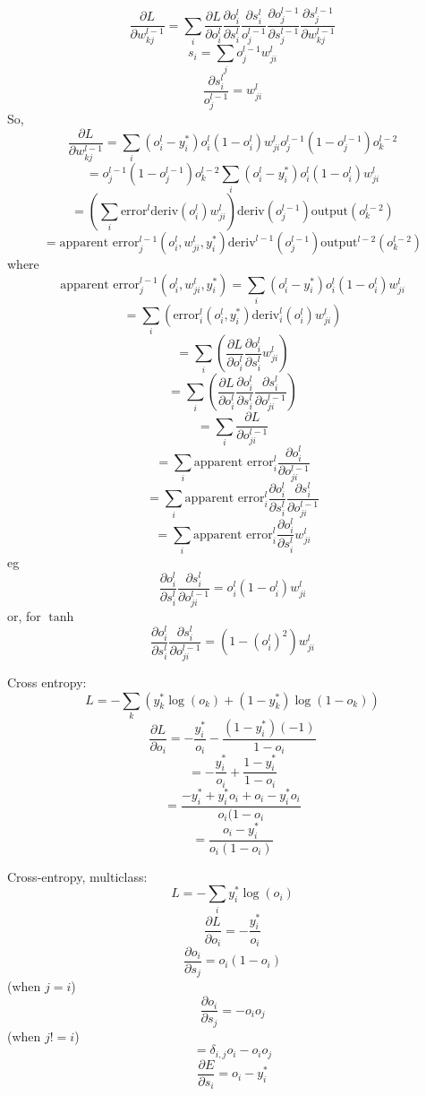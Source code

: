\documentclass[a4paper,12pt,fleqn]{article}
\newcommand{\ult}{\vspace{12px}\noindent}
\begin{document}
\[ \frac{\partial L}{\partial w^{l-1}_{kj}} = \sum_i \frac{\partial L}{\partial o^l_i}
\frac{\partial o^l_i}{\partial s^l_i} \frac{\partial s^l_i}{o^{l-1}_j}\frac{\partial o^{l-1}_j}{\partial s^{l-1}_j}
\frac{\partial s^{l-1}_j}{\partial w^{l-1}_{kj}} \]
\[ s_i =  \sum_j o^{l-1}_j w^l_{ji} \]
\[ \frac{\partial s^l_i}{o^{l-1}_j} = w^l_{ji} \]
So, \[ \frac{\partial L}{\partial w^{l-1}_{kj}} =\sum_i (o^l_i - y^*_i)o^l_i(1-o^l_i)w^l_{ji}o^{l-1}_{j}(1 - o^{l-1}_{j})o^{l-2}_k \]
\[ = o^{l-1}_{j}(1 - o^{l-1}_{j})o^{l-2}_k \sum_i (o^l_i - y^*_i)o^l_i(1-o^l_i)w^l_{ji} \]
\[ = (\sum_i \text{error}^l \text{deriv}(o^l_i) w^l_{ji}) \text{deriv}(o^{l-1}_j) \text{output}(o^{l-2}_k)   \]
\[ = \text{apparent error}^{l-1}_j(o^l_i, w^l_{ji}, y^*_i) \text{deriv}^{l-1}(o^{l-1}_j) \text{output}^{l-2}(o^{l-2}_k) \]
where \[ \text{apparent error}^{l-1}_j(o^l_i, w^l_{ji}, y^*_i) = \sum_i (o^l_i - y^*_i)o^l_i(1-o^l_i)w^l_{ji} \]
\[ = \sum_i (\text{error}^l_i(o^l_i, y^*_i)\text{deriv}^l_i(o^l_i)w^l_{ji}) \]
\[ = \sum_i ( \frac{\partial L}{\partial o^l_i} \frac{\partial o^l_i}{\partial s^l_i} w^l_{ji} ) \]
\[ = \sum_i ( \frac{\partial L}{\partial o^l_i} \frac{\partial o^l_i}{\partial s^l_i} \frac{\partial s^l_i}{\partial o^{l-1}_{ji}} ) \]
\[ =\sum_i \frac{\partial L}{\partial o^{l-1}_{ji}} \]
\[ =\sum_i \text{apparent error}^l_i \frac{\partial o^l_i}{\partial o^{l-1}_{ji}} \]
\[ =\sum_i \text{apparent error}^l_i \frac{\partial o^l_i}{\partial s^l_i} \frac{\partial s^l_i}{\partial o^{l-1}_{ji}} \]
\[ =\sum_i \text{apparent error}^l_i \frac{\partial o^l_i}{\partial s^l_i} w^l_{ji} \]
eg \[ \frac{\partial o^l_i}{\partial s^l_i} \frac{\partial s^l_i}{\partial o^{l-1}_{ji}} 
= o^l_i(1-o^l_i) w^l_{ji} \]
or, for $\tanh$ \[ \frac{\partial o^l_i}{\partial s^l_i} \frac{\partial s^l_i}{\partial o^{l-1}_{ji}} 
= ( 1 - (o^l_i)^2) w^l_{ji} \]

\ult{Error functions}

Cross entropy: \[ L = - \sum_k ( y^*_k \log( o_k ) + ( 1 - y^*_k) \log(1 - o_k) ) \]
\[ \frac{\partial L}{\partial o_i} = - \frac{y^*_i}{o_i} - \frac{(1 - y^*_i)(-1)}{1 - o_i} \]
\[ = - \frac{y^*_i}{o_i} + \frac{1 - y^*_i}{1 - o_i} \]
\[ = \frac{-y^*_i + y^*_i o_i + o_i - y^*_i o_i}{o_i(1-o_i} \]
\[ = \frac{o_i - y^*_i}{o_i(1-o_i)} \]

Cross-entropy, multiclass: \[ L = - \sum_i y^*_i \log(o_i) \]
\[ \frac{\partial L}{\partial o_i} = - \frac{ y^*_i}{o_i}  \]
\[ \frac{\partial o_i}{\partial s_j} = o_i(1-o_i) \] (when $j = i$)
\[ \frac{\partial o_i}{\partial s_j} = -o_i o_j \] (when $j != i$)
\[ = \delta_{i,j}o_i - o_i o_j \]
\[ \frac{\partial E}{\partial s_i} = o_i - y^*_i \]
\end{document}
